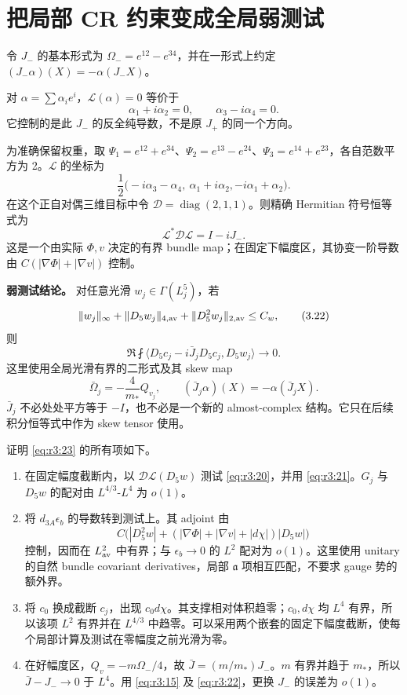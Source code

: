 \documentclass[UTF8,11pt,fontset=none]{ctexart}
\providecommand{\tightlist}{\setlength{\itemsep}{1pt}\setlength{\parskip}{0pt}}
\begin{document}
\section{把局部 CR 约束变成全局弱测试}\label{ch3:ux628aux5c40ux90e8-cr-ux7ea6ux675fux53d8ux6210ux5168ux5c40ux5f31ux6d4bux8bd5}

令 \(J_-\) 的基本形式为 \(\Omega_-=e^{12}-e^{34}\)，并在一形式上约定 \((J_-\alpha)(X)=-\alpha(J_-X)\)。

对 \(\alpha=\sum\alpha_i e^i\)，\(\mathcal L(\alpha)=0\) 等价于 \[
 \alpha_1+i\alpha_2=0,\qquad\alpha_3-i\alpha_4=0.
\] 它控制的是此 \(J_-\) 的反全纯导数，不是原 \(J_+\) 的同一个方向。

为准确保留权重，取 \(\Psi_1=e^{12}+e^{34}\)、\(\Psi_2=e^{13}-e^{24}\)、\(\Psi_3=e^{14}+e^{23}\)，各自范数平方为 2。\(\mathcal L\) 的坐标为 \[
 \frac12\bigl(-i\alpha_3-\alpha_4,\ \alpha_1+i\alpha_2,
                                      -i\alpha_1+\alpha_2\bigr).
\] 在这个正自对偶三维目标中令 \(\mathcal D=\operatorname{diag}(2,1,1)\)。则精确 Hermitian 符号恒等式为 \[
 \boxed{\mathcal L^*\mathcal D\mathcal L=I-iJ_-.}
 \tag{3.21}\label{eq:r3:21}
\] 这是一个由实际 \(\Phi,v\) 决定的有界 bundle map；在固定下幅度区，其协变一阶导数由 \(C(|\nabla\Phi|+|\nabla v|)\) 控制。

\textbf{弱测试结论。} 对任意光滑 \(w_j\in\Gamma(L_j^5)\)，若 \[
 \|w_j\|_\infty+\|D_5w_j\|_{4,\rm av}
                      +\|D_5^2w_j\|_{2,\rm av}\le C_w,
 \tag{3.22}\label{eq:r3:22}
\] 则 \[
 \Re\fint\langle D_5c_j-i\bar J_jD_5c_j,D_5w_j\rangle\to0.
 \tag{3.23}\label{eq:r3:23}
\] 这里使用全局光滑有界的二形式及其 skew map \[
 \bar\Omega_j=-\frac4{m_*}Q_{v_j},\qquad
 (\bar J_j\alpha)(X)=-\alpha(\bar J_jX).
 \tag{3.24}\label{eq:r3:24}
\] \(\bar J_j\) 不必处处平方等于 \(-I\)，也不必是一个新的 almost-complex 结构。它只在后续积分恒等式中作为 skew tensor 使用。

证明 \eqref{eq:r3:23} 的所有项如下。

\begin{enumerate}
\def\labelenumi{\arabic{enumi}.}
\tightlist
\item
  在固定幅度截断内，以 \(\mathcal D\mathcal L(D_5w)\) 测试 \eqref{eq:r3:20}，并用 \eqref{eq:r3:21}。\(G_j\) 与 \(D_5w\) 的配对由 \(L^{4/3}\)-\(L^4\) 为 \(o(1)\)。
\item
  将 \(d_{3A}\epsilon_b\) 的导数转到测试上。其 adjoint 由 \[
   C\bigl(|D_5^2w|+(|\nabla\Phi|+|\nabla v|+|d\chi|)|D_5w|\bigr)
  \] 控制，因而在 \(L^2_{\rm av}\) 中有界；与 \(\epsilon_b\to0\) 的 \(L^2\) 配对为 \(o(1)\)。这里使用 unitary 的自然 bundle covariant derivatives，局部 \(\mathfrak a\) 项相互匹配，不要求 gauge 势的额外界。
\item
  将 \(c_0\) 换成截断 \(c_j\)，出现 \(c_0d\chi\)。其支撑相对体积趋零；\(c_0,d\chi\) 均 \(L^4\) 有界，所以该项 \(L^2\) 有界并在 \(L^{4/3}\) 中趋零。可以采用两个嵌套的固定下幅度截断，使每个局部计算及测试在零幅度之前光滑为零。
\item
  在好幅度区，\(Q_v=-m\Omega_-/4\)，故 \(\bar J=(m/m_*)J_-\)。\(m\) 有界并趋于 \(m_*\)，所以 \(\bar J-J_-\to0\) 于 \(L^4\)。用 \eqref{eq:r3:15} 及 \eqref{eq:r3:22}，更换 \(J_-\) 的误差为 \(o(1)\)。
\end{enumerate}
\end{document}
